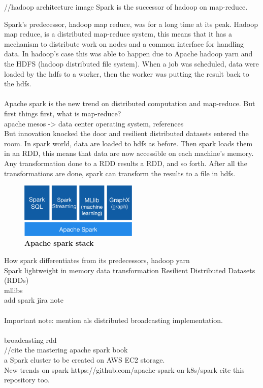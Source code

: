 //hadoop architecture image \cite{Hadoop:9}
Spark is the successor of hadoop on map-reduce.

Spark's predecessor, hadoop map reduce, was for a long time at its peak. Hadoop map reduce, is a distributed map-reduce system, this means that it has a mechanism to distribute work on nodes and a common interface for handling data. In hadoop's case this was able to happen due to Apache hadoop yarn and the HDFS (hadoop distributed file system). When a job was scheduled, data were loaded by the hdfs to a worker, then the worker was putting the result back to the hdfs. 

\paragraph{}Apache spark is the new trend on distributed computation and map-reduce. 
But first things first, what is map-reduce? \\
apache mesos -> data center operating system, references
\\
But innovation knocked the door and resilient distributed datasets entered the room. In spark world, data are loaded to hdfs as before. Then spark loads them in an RDD, this means that data are now accessible on each machine's memory. Any transformation done to a RDD results a RDD, and so forth. After all the transformations are done, spark can transform the results to a file in hdfs.

\begin{figure}[ht]
  \centering
    \includegraphics[width=0.5\textwidth]{images/spark-stack.png}
    \caption{\bfseries Apache spark stack \cite{ApacheSpark:1}}
   \label{apacheSparkStack}
\end{figure}

How spark differentiates from its predecessors, hadoop yarn\\
Spark lightweight in memory data transformation 
Resilient Distributed Datasets (RDDs) \\
mllibs\\
add spark jira note \\\\
Important note: mention als distributed broadcasting implementation. 
\\\\
broadcasting rdd \\
//cite the mastering apache spark book
\cite{ApacheSpark:1} \\
a Spark cluster to be created on AWS EC2 storage.\\
New trends on spark https://github.com/apache-spark-on-k8s/spark cite this repository too.
